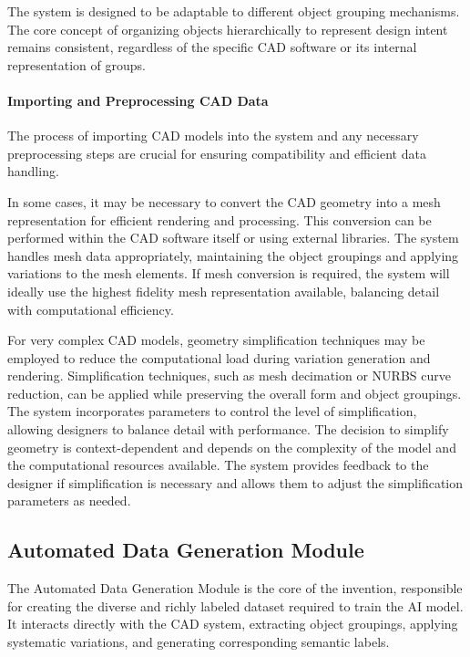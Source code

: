 \documentclass{article}
\begin{document}
The system is designed to be adaptable to different object grouping mechanisms. The core concept of organizing objects hierarchically to represent design intent remains consistent, regardless of the specific CAD software or its internal representation of groups.

\paragraph{Importing and Preprocessing CAD Data}
The process of importing CAD models into the system and any necessary preprocessing steps are crucial for ensuring compatibility and efficient data handling.

In some cases, it may be necessary to convert the CAD geometry into a mesh representation for efficient rendering and processing. This conversion can be performed within the CAD software itself or using external libraries. The system handles mesh data appropriately, maintaining the object groupings and applying variations to the mesh elements. If mesh conversion is required, the system will ideally use the highest fidelity mesh representation available, balancing detail with computational efficiency.

For very complex CAD models, geometry simplification techniques may be employed to reduce the computational load during variation generation and rendering. Simplification techniques, such as mesh decimation or NURBS curve reduction, can be applied while preserving the overall form and object groupings. The system incorporates parameters to control the level of simplification, allowing designers to balance detail with performance. The decision to simplify geometry is context-dependent and depends on the complexity of the model and the computational resources available. The system provides feedback to the designer if simplification is necessary and allows them to adjust the simplification parameters as needed.

\subsection{Automated Data Generation Module}

The Automated Data Generation Module is the core of the invention, responsible for creating the diverse and richly labeled dataset required to train the AI model. It interacts directly with the CAD system, extracting object groupings, applying systematic variations, and generating corresponding semantic labels.
\end{document}

